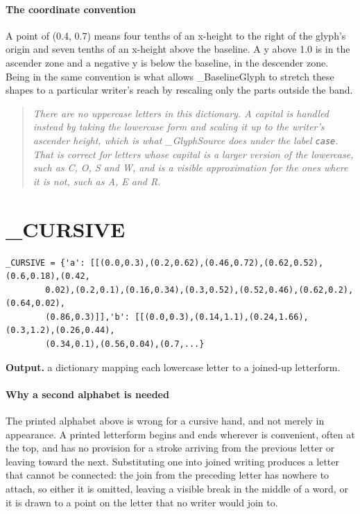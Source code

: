 \paragraph{The coordinate convention}
A point of (0.4, 0.7) means four tenths of an x-height to the right of the glyph's origin and seven tenths of an x-height above the baseline. A y above 1.0 is in the ascender zone and a negative y is below the baseline, in the descender zone. Being in the same convention is what allows \_BaselineGlyph to stretch these shapes to a particular writer's reach by rescaling only the parts outside the band.


\begin{quote}\small\itshape There are no uppercase letters in this dictionary. A capital is handled instead by taking the lowercase form and scaling it up to the writer's ascender height, which is what \_GlyphSource does under the label \texttt{case}. That is correct for letters whose capital is a larger version of the lowercase, such as C, O, S and W, and is a visible approximation for the ones where it is not, such as A, E and R.\end{quote}

\section{\_CURSIVE}
\begin{lstlisting}[style=sig]
_CURSIVE = {'a': [[(0.0,0.3),(0.2,0.62),(0.46,0.72),(0.62,0.52),(0.6,0.18),(0.42,
        0.02),(0.2,0.1),(0.16,0.34),(0.3,0.52),(0.52,0.46),(0.62,0.2),(0.64,0.02),
        (0.86,0.3)]],'b': [[(0.0,0.3),(0.14,1.1),(0.24,1.66),(0.3,1.2),(0.26,0.44),
        (0.34,0.1),(0.56,0.04),(0.7,...}
\end{lstlisting}

\noindent\textbf{Output.} a dictionary mapping each lowercase letter to a joined-up letterform.


\paragraph{Why a second alphabet is needed}
The printed alphabet above is wrong for a cursive hand, and not merely in appearance. A printed letterform begins and ends wherever is convenient, often at the top, and has no provision for a stroke arriving from the previous letter or leaving toward the next. Substituting one into joined writing produces a letter that cannot be connected: the join from the preceding letter has nowhere to attach, so either it is omitted, leaving a visible break in the middle of a word, or it is drawn to a point on the letter that no writer would join to.

